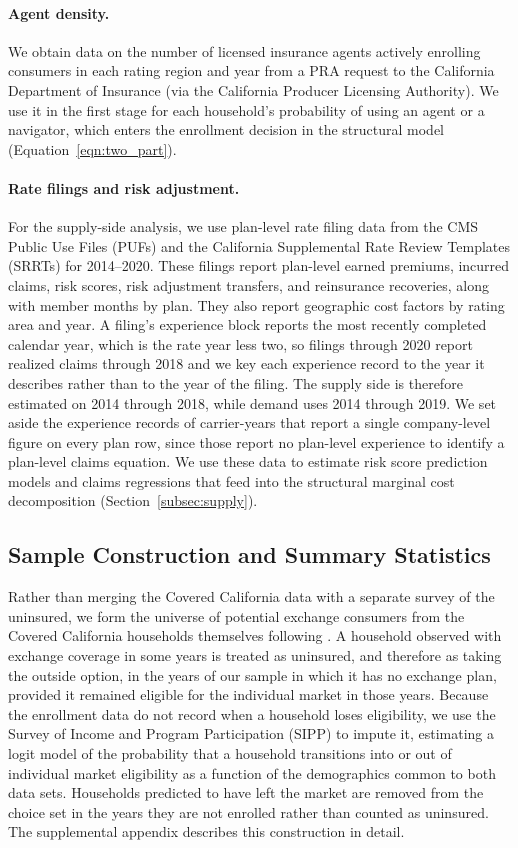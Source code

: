 \documentclass[12pt]{article}
\begin{document}
\paragraph{Agent density.} We obtain data on the number of licensed insurance agents actively enrolling consumers in each rating region and year from a PRA request to the California Department of Insurance (via the California Producer Licensing Authority). We use it in the first stage for each household's probability of using an agent or a navigator, which enters the enrollment decision in the structural model (Equation~\eqref{eqn:two_part}).

\paragraph{Rate filings and risk adjustment.} For the supply-side analysis, we use plan-level rate filing data from the CMS Public Use Files (PUFs) and the California Supplemental Rate Review Templates (SRRTs) for 2014--2020. These filings report plan-level earned premiums, incurred claims, risk scores, risk adjustment transfers, and reinsurance recoveries, along with member months by plan. They also report geographic cost factors by rating area and year. A filing's experience block reports the most recently completed calendar year, which is the rate year less two, so filings through 2020 report realized claims through 2018 and we key each experience record to the year it describes rather than to the year of the filing. The supply side is therefore estimated on 2014 through 2018, while demand uses 2014 through 2019. We set aside the experience records of carrier-years that report a single company-level figure on every plan row, since those report no plan-level experience to identify a plan-level claims equation.  We use these data to estimate risk score prediction models and claims regressions that feed into the structural marginal cost decomposition (Section~\ref{subsec:supply}).

\subsection{Sample Construction and Summary Statistics}

Rather than merging the Covered California data with a separate survey of the uninsured, we form the universe of potential exchange consumers from the Covered California households themselves following \citep{saltzman2025}. A household observed with exchange coverage in some years is treated as uninsured, and therefore as taking the outside option, in the years of our sample in which it has no exchange plan, provided it remained eligible for the individual market in those years. Because the enrollment data do not record when a household loses eligibility, we use the Survey of Income and Program Participation (SIPP) to impute it, estimating a logit model of the probability that a household transitions into or out of individual market eligibility as a function of the demographics common to both data sets. Households predicted to have left the market are removed from the choice set in the years they are not enrolled rather than counted as uninsured. The supplemental appendix describes this construction in detail.
\end{document}
